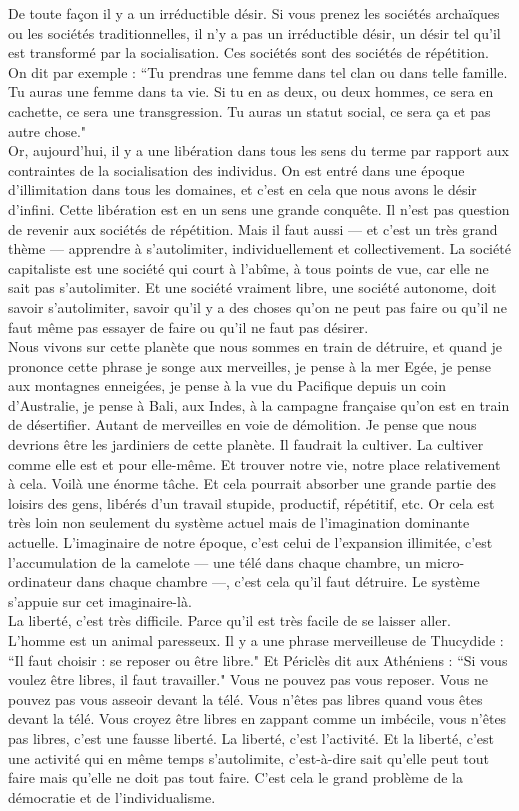 De toute façon il y a un irréductible désir. Si vous prenez les sociétés archaïques ou les sociétés traditionnelles, il n’y a pas un irréductible désir, un désir tel qu’il est transformé par la socialisation. Ces sociétés sont des sociétés de répétition. On dit par exemple : ``Tu prendras une femme dans tel clan ou dans telle famille. Tu auras une femme dans ta vie. Si tu en as deux, ou deux hommes, ce sera en cachette, ce sera une transgression. Tu auras un statut social, ce sera ça et pas autre chose."\\
Or, aujourd’hui, il y a une libération dans tous les sens du terme par rapport aux contraintes de la socialisation des individus. On est entré dans une époque d’illimitation dans tous les domaines, et c’est en cela que nous avons le désir d’infini. Cette libération est en un sens une grande conquête. Il n’est pas question de revenir aux sociétés de répétition. Mais il faut aussi --- et c’est un très grand thème --- apprendre à s’autolimiter, individuellement et collectivement. La société capitaliste est une société qui court à l’abîme, à tous points de vue, car elle ne sait pas s’autolimiter. Et une société vraiment libre, une société autonome, doit savoir s’autolimiter, savoir qu’il y a des choses qu’on ne peut pas faire ou qu’il ne faut même pas essayer de faire ou qu’il ne faut pas désirer.\\
Nous vivons sur cette planète que nous sommes en train de détruire, et quand je prononce cette phrase je songe aux merveilles, je pense à la mer Egée, je pense aux montagnes enneigées, je pense à la vue du Pacifique depuis un coin d’Australie, je pense à Bali, aux Indes, à la campagne française qu’on est en train de désertifier. Autant de merveilles en voie de démolition. Je pense que nous devrions être les jardiniers de cette planète. Il faudrait la cultiver. La cultiver comme elle est et pour elle-même. Et trouver notre vie, notre place relativement à cela. Voilà une énorme tâche. Et cela pourrait absorber une grande partie des loisirs des gens, libérés d’un travail stupide, productif, répétitif, etc. Or cela est très loin non seulement du système actuel mais de l’imagination dominante actuelle. L’imaginaire de notre époque, c’est celui de l’expansion illimitée, c’est l’accumulation de la camelote --- une télé dans chaque chambre, un micro-ordinateur dans chaque chambre ---, c’est cela qu’il faut détruire. Le système s’appuie sur cet imaginaire-là.\\
La liberté, c’est très difficile. Parce qu’il est très facile de se laisser aller. L’homme est un animal paresseux. Il y a une phrase merveilleuse de Thucydide : ``Il faut choisir : se reposer ou être libre." Et Périclès dit aux Athéniens : ``Si vous voulez être libres, il faut travailler." Vous ne pouvez pas vous reposer. Vous ne pouvez pas vous asseoir devant la télé. Vous n’êtes pas libres quand vous êtes devant la télé. Vous croyez être libres en zappant comme un imbécile, vous n’êtes pas libres, c’est une fausse liberté. La liberté, c’est l’activité. Et la liberté, c’est une activité qui en même temps s’autolimite, c’est-à-dire sait qu’elle peut tout faire mais qu’elle ne doit pas tout faire. C’est cela le grand problème de la démocratie et de l’individualisme.


